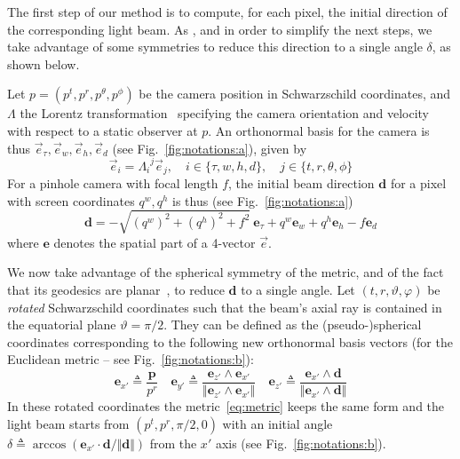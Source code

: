 \documentclass{document}
\begin{document}
The first step of our method is to compute, for each pixel, the initial 
direction of the corresponding light beam. As \cite{Muller2010}, and in order 
to simplify the next steps, we take advantage of some symmetries to reduce this 
direction to a single angle $\delta$, as shown below.

Let $p=(p^t, p^r, p^\theta, p^\phi)$ be the camera position in Schwarzschild 
coordinates, and $\Lambda$ the Lorentz transformation~\cite{weinberg1972} 
specifying the camera orientation and velocity with respect to a static 
observer at $p$. An orthonormal basis for the camera is thus $\vec{e}_{\tau}, 
\vec{e}_w, \vec{e}_h, \vec{e}_d$ (see Fig.~\ref{fig:notations:a}), given by
\begin{equation}
\vec{e}_i = {\Lambda_i}^j \vec{e}_j, \quad i \in \{\tau, w, h, d\}, \quad j \in 
\{t, r, \theta, \phi\} \label{eq:camerabasis}
\end{equation}
For a pinhole camera with focal length $f$, the initial beam direction 
$\mathbf{d}$ for a pixel with screen coordinates $q^w, q^h$ is thus (see 
Fig.~\ref{fig:notations:a})
\begin{equation}
{\mathbf d} = -\sqrt{(q^w)^2 + (q^h)^2 + f^2}\ {\mathbf e}_{\tau} + 
              q^w {\mathbf e}_w + 
              q^h {\mathbf e}_h - 
              f {\mathbf e}_d
\label{eq:d}
\end{equation}
where ${\mathbf e}$ denotes the spatial part of a 4-vector $\vec{e}$.

We now take advantage of the spherical symmetry of the metric, and of the fact 
that its geodesics are planar~\cite{weinberg1972}, to reduce ${\mathbf d}$ to a 
single angle. Let $(t, r, \vartheta, \varphi)$ be {\em rotated} Schwarzschild 
coordinates such that the beam's axial ray is contained in the equatorial plane 
$\vartheta = \pi/2$. They can be defined as the (pseudo-)spherical coordinates
corresponding to the following new orthonormal basis vectors (for the Euclidean
metric -- see Fig.~\ref{fig:notations:b}):
\begin{equation}
{\mathbf e}_{x'} \triangleq \frac{{\mathbf p}}{p^r} \quad
{\mathbf e}_{y'} \triangleq 
    \frac{{\mathbf e}_{z'} \wedge {\mathbf e}_{x'}}
         {\Vert {\mathbf e}_{z'} \wedge {\mathbf e}_{x'} \Vert} \quad
{\mathbf e}_{z'} \triangleq 
    \frac{{\mathbf e}_{x'} \wedge {\mathbf d}}
         {\Vert {\mathbf e}_{x'} \wedge {\mathbf d} \Vert}
\label{eq:raybasis}
\end{equation}
In these rotated coordinates the metric~\eqref{eq:metric} keeps the same form 
and the light beam starts from $(p^t, p^r, \pi/2, 0)$ with an initial angle 
$\delta \triangleq \arccos({\mathbf e}_{x'} \cdot {\mathbf d} / \Vert {\mathbf 
d} \Vert)$ from the $x'$ axis (see Fig.~\ref{fig:notations:b}).
\end{document}
